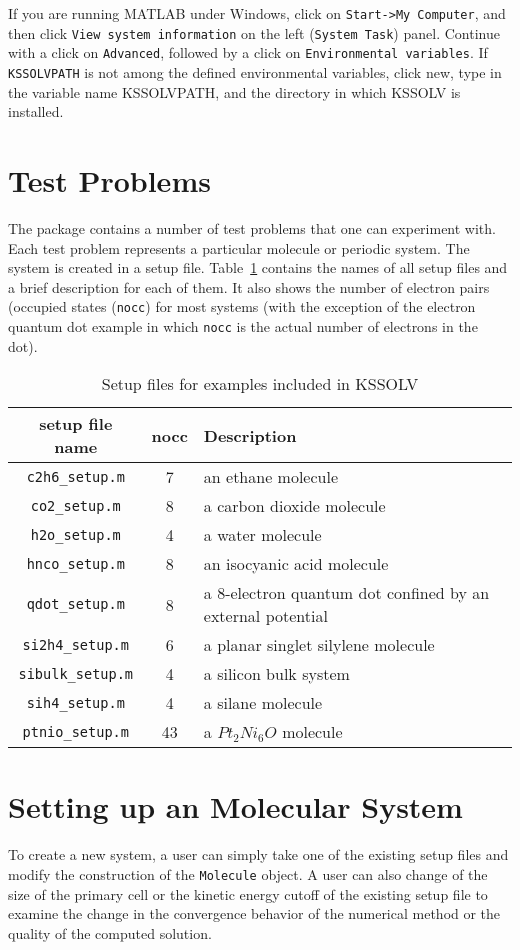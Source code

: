 \documentclass[11pt]{book}
\begin{document}
If you are running MATLAB under Windows, click on {\tt Start->My Computer}, 
and then click {\tt View system information} on the left ({\tt System Task}) 
panel. Continue with a click on {\tt Advanced}, followed by a click on 
{\tt Environmental variables}. If 
{\tt KSSOLVPATH} is not among the defined environmental variables, click new, 
type in the variable name KSSOLVPATH, and the directory in which KSSOLV is installed.

\section{Test Problems}
The package contains a number of test problems that one can experiment
with.  Each test problem represents a particular molecule or
periodic system. The system is created in a setup file.  Table~\ref{egtab}
contains the names of all setup files and a brief description for each
of them. It also shows the number of electron pairs (occupied states ({\tt nocc})
for most systems (with the exception of the electron quantum dot example in 
which {\tt nocc} is the actual number of electrons in the dot).  
%
\begin{table}[htbp]
\center
\begin{tabular}{|c|c|l|} \hline
 setup file name      &   nocc &  Description \\ \hline
{\tt c2h6\_setup.m}   &     7  &  an ethane molecule \\
{\tt co2\_setup.m}    &     8  &  a carbon dioxide molecule\\
{\tt h2o\_setup.m}    &     4  &  a water molecule \\
{\tt hnco\_setup.m}   &     8  &  an isocyanic acid molecule \\
{\tt qdot\_setup.m}   &     8  &  a 8-electron quantum dot confined 
                                  by an external potential\\
{\tt si2h4\_setup.m}  &     6  &  a planar singlet silylene molecule \\
{\tt sibulk\_setup.m} &     4  &  a silicon bulk system \\
{\tt sih4\_setup.m}   &     4  &  a silane molecule \\
{\tt ptnio\_setup.m}  &     43 &  a $Pt_2Ni_6O$ molecule \\
\hline
\end{tabular}
\caption{Setup files for examples included in KSSOLV}
\label{egtab}
\end{table}
%
\section{Setting up an Molecular System}
To create a new system, a user can simply take one of the existing setup 
files and modify the construction of the {\tt Molecule} object. A user can 
also change of the size of the primary cell or the kinetic energy cutoff of 
the existing setup file to examine the change in the convergence behavior 
of the numerical method or the quality of the computed solution.
\end{document}
